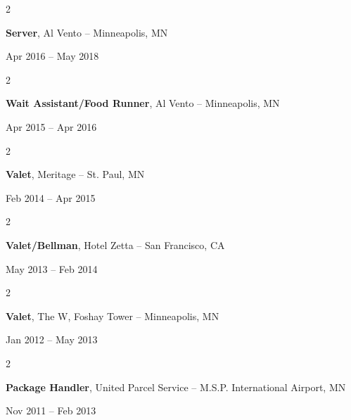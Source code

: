 \documentclass[10pt, letterpaper]{article}
\newenvironment{twocolentry}[2][]{
    \onecolentry
    \def\secondColumn{#2}
    \setcolumnwidth{\fill, 4.5 cm}
    \begin{paracol}{2}
}{
    \switchcolumn \raggedleft \secondColumn
    \end{paracol}
    \endonecolentry
} %
\begin{document}
        \vspace{0.2 cm}


        \begin{samepage} 
            \begin{twocolentry}{
                Apr 2016 – May 2018
                }
                \textbf{Server}, Al Vento -- Minneapolis, MN
            \end{twocolentry}
        \end{samepage}  


        \vspace{0.2 cm}


        \begin{samepage} 
            \begin{twocolentry}{
                Apr 2015 – Apr 2016
                }
                \textbf{Wait Assistant/Food Runner}, Al Vento -- Minneapolis, MN
            \end{twocolentry}
        \end{samepage}  


        \vspace{0.2 cm}
        
        
        \begin{samepage} 
            \begin{twocolentry}{
                Feb 2014 – Apr 2015
                }
                \textbf{Valet}, Meritage -- St. Paul, MN
            \end{twocolentry}
        \end{samepage}  


        \vspace{0.2 cm}


        \begin{samepage} 
            \begin{twocolentry}{
                May 2013 – Feb 2014
                }
                \textbf{Valet/Bellman}, Hotel Zetta -- San Francisco, CA
            \end{twocolentry}
        \end{samepage}  


        \vspace{0.2 cm}


        \begin{samepage} 
            \begin{twocolentry}{
                Jan 2012 – May 2013
                }
                \textbf{Valet}, The W, Foshay Tower -- Minneapolis, MN
            \end{twocolentry}
        \end{samepage}  


        \vspace{0.2 cm}


        \begin{samepage} 
            \begin{twocolentry}{
                Nov 2011 – Feb 2013
                }
                \textbf{Package Handler}, United Parcel Service -- M.S.P. International Airport, MN
            \end{twocolentry}
        \end{samepage}  
\end{document}
